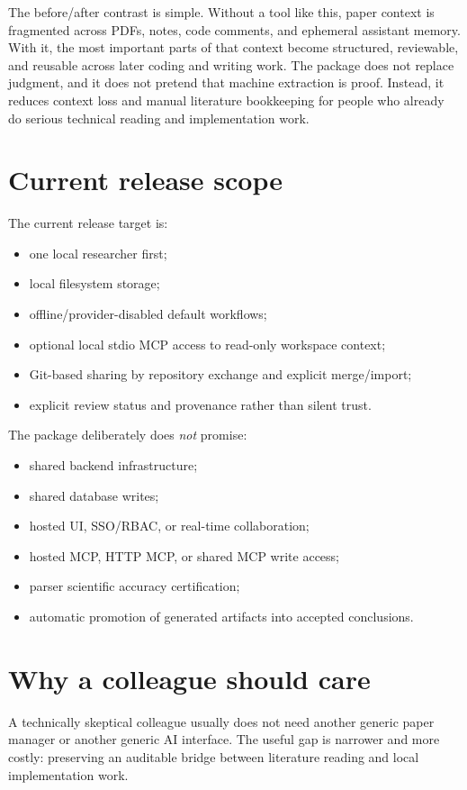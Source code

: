 \documentclass[11pt,a4paper,openany]{book}
\begin{document}
The before/after contrast is simple. Without a tool like this, paper context is
fragmented across PDFs, notes, code comments, and ephemeral assistant memory.
With it, the most important parts of that context become structured, reviewable,
and reusable across later coding and writing work. The package does not replace
judgment, and it does not pretend that machine extraction is proof. Instead, it
reduces context loss and manual literature bookkeeping for people who already do
serious technical reading and implementation work.

\section{Current release scope}

The current release target is:
\begin{itemize}[nosep]
  \item one local researcher first;
  \item local filesystem storage;
  \item offline/provider-disabled default workflows;
  \item optional local stdio MCP access to read-only workspace context;
  \item Git-based sharing by repository exchange and explicit merge/import;
  \item explicit review status and provenance rather than silent trust.
\end{itemize}

The package deliberately does \emph{not} promise:
\begin{itemize}[nosep]
  \item shared backend infrastructure;
  \item shared database writes;
  \item hosted UI, SSO/RBAC, or real-time collaboration;
  \item hosted MCP, HTTP MCP, or shared MCP write access;
  \item parser scientific accuracy certification;
  \item automatic promotion of generated artifacts into accepted conclusions.
\end{itemize}

\section{Why a colleague should care}

A technically skeptical colleague usually does not need another generic paper
manager or another generic AI interface. The useful gap is narrower and more
costly: preserving an auditable bridge between literature reading and local
implementation work.
\end{document}
